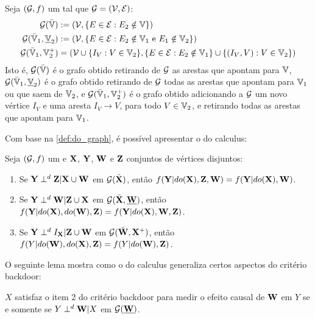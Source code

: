 \begin{definition}
 \label{def:do_graph}
 Seja $({\mathcal G},f)$ um \CM tal que ${\mathcal G} = ({\mathcal V},{\mathcal E})$:
 \begin{align*}
  {\mathcal G}(\bar{{\mathbb V}}) 
  &:= ({\mathcal V}, \{E \in {\mathcal E}: E_2 \notin {\mathbb V}\}) \\
  {\mathcal G}(\bar{{\mathbb V}}_1, \underline{{\mathbb V}}_2)
  &:= ({\mathcal V}, \{E \in {\mathcal E}: E_2 \notin {\mathbb V}_1 \text{ e } E_1 \notin {\mathbb V}_2\}) \\
  {\mathcal G}(\bar{{\mathbb V}}_1, {\mathbb V}_2^{+})
  &= ({\mathcal V} \cup \{I_V: V \in {\mathbb V}_2\}, 
  \{E \in {\mathcal E}: E_2 \notin {\mathbb V}_1\} \cup \{(I_V, V): V \in {\mathbb V}_2\})
 \end{align*}
 Isto é, ${\mathcal G}(\bar{{\mathbb V}})$ é
 o grafo obtido retirando de ${\mathcal G}$ as arestas que apontam para ${\mathbb V}$,
 ${\mathcal G}(\bar{{\mathbb V}}_1, \underline{{\mathbb V}}_2)$ é 
 o grafo obtido retirando de ${\mathcal G}$ 
 todas as arestas que apontam para ${\mathbb V}_1$ ou 
 que saem de ${\mathbb V}_2$, e
 ${\mathcal G}(\bar{{\mathbb V}}_1, {\mathbb V}_2^{+})$ é 
 o grafo obtido adicionando a ${\mathcal G}$ um novo vértice $I_V$ e
 uma aresta $I_V \rightarrow V$, para todo $V \in {\mathbb V}_2$, e
 retirando todas as arestas que apontam para ${\mathbb V}_1$.
\end{definition}

Com base na \cref{def:do_graph},
é possível apresentar o do calculus:

\begin{theorem}
 Seja $({\mathcal G},f)$ um \CM e ${\mathbf{X}}$, ${\mathbf{Y}}$, ${\mathbf{W}}$ e ${\mathbf{Z}}$ 
 conjuntos de vértices disjuntos:
 \label{thm:do_calculus}
 \begin{enumerate}
  \item  Se ${\mathbf{Y}} \perp^d {\mathbf{Z}} | {\mathbf{X}} \cup {\mathbf{W}}$ em ${\mathcal G}(\bar{{\mathbf{X}}})$, então
  $f({\mathbf{Y}}|do({\mathbf{X}}), {\mathbf{Z}}, {\mathbf{W}}) = f({\mathbf{Y}}|do({\mathbf{X}}), {\mathbf{W}})$.
  \item Se ${\mathbf{Y}} \perp^d {\mathbf{W}} | {\mathbf{Z}} \cup {\mathbf{X}}$ em ${\mathcal G}(\bar{{\mathbf{X}}}, \underline{{\mathbf{W}}})$, então
  $f({\mathbf{Y}}|do({\mathbf{X}}), do({\mathbf{W}}), {\mathbf{Z}}) = f({\mathbf{Y}}|do({\mathbf{X}}), {\mathbf{W}}, {\mathbf{Z}})$.
  \item Se ${\mathbf{Y}} \perp^d I_{{\mathbf{X}}} | {\mathbf{Z}} \cup {\mathbf{W}}$ em ${\mathcal G}(\bar{{\mathbf{W}}}, {\mathbf{X}}^{+})$, então
  $f(Y|do({\mathbf{W}}), do({\mathbf{X}}), {\mathbf{Z}}) = f(Y|do({\mathbf{W}}), {\mathbf{Z}})$.
 \end{enumerate}
\end{theorem}

O seguinte lema mostra como
o do calculus generaliza 
certos aspectos do critério backdoor:

\begin{lemma}
 \label{lemma:do_calculus_backdoor}
 $X$ satisfaz o item 2 do critério backdoor
 para medir o efeito causal de ${\mathbf{W}}$ em $Y$ 
 se e somente se $Y \perp^d {\mathbf{W}} | X$ em ${\mathcal G}(\underline{{\mathbf{W}}})$.
\end{lemma}

